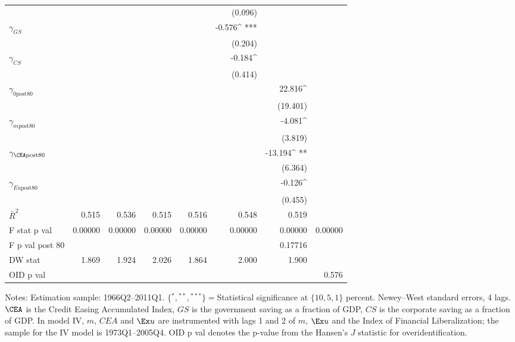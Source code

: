 \begin{table}
\begin{center}
\begin{tabular}{@{}ld{6}d{6}d{6}d{6}d{6}d{6}d{6}@{}}
 &   &  & & & (0.096)  & & \\
 $\gamma_{GS}$  &   & & & & -0.576^{ ***}  & & \\
 &   &  & & & (0.204)  &  & \\
 $\gamma_{CS}$  &   & & & &-0.184^{ }  & & \\
 &   &  & & & (0.414)  & & \\
 $\gamma_{\text{0post80}}$  &   & & & & &22.816^{ }  &  \\
 &   &  & & & & (19.401)   & \\
 $\gamma_{m\text{post80}}$  &   & & & & &-4.081^{ }  &  \\
 &   &  & &  & &(3.819)  &  \\
 $\gamma_{\CEA\text{post80}}$  &   & & & & &-13.194^{ **}  & \\
 &   &  & & & &(6.364)  & \\
 $\gamma_{Eu\text{post80}}$  &   & & & & &-0.126^{ }  &  \\
 &   &  & &  & & (0.455)  &  \\
\midrule
 $\bar{R}^2$  & 0.515  & 0.536  & 0.515  & 0.516  & 0.548  & 0.519  & \\
 F stat p val  & 0.00000  & 0.00000  & 0.00000  & 0.00000  & 0.00000  & 0.00000  & 0.00000\\
 F p val post 80 &  & & & & & 0.17716  &  \\
DW stat  & 1.869  & 1.924  & 2.026  & 1.864  & 2.000  & 1.900 & \\
OID p val &  & & & &  & & 0.576\\
\bottomrule
\end{tabular}
\end{center}
 {\footnotesize Notes: Estimation sample: 1966Q2--2011Q1. $\{{}^*,{}^{**},{}^{***}\}={}$Statistical significance at $\{10,5,1\}$ percent. Newey--West standard errors, 4 lags. $\CEA$ is the Credit Easing Accumulated Index, $GS$ is the government saving as a fraction of GDP, $CS$ is the corporate saving as a fraction of GDP. In model IV, $m$, $CEA$ and $\Ex u$ are instrumented with lags 1 and 2 of $m$, $\Ex u$ and the \cite{abiadEtAl_FinReforms} Index of Financial Liberalization; the sample for the IV model is 1973Q1--2005Q4. OID p val denotes the p-value from the Hansen's $J$ statistic for overidentification.}
\end{table}
